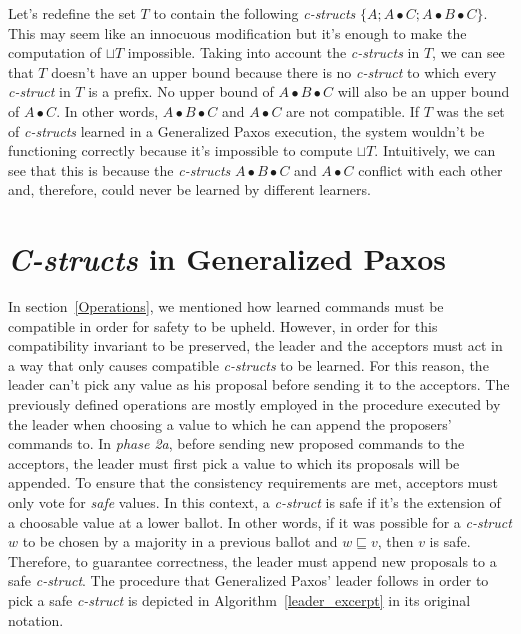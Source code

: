 Let's redefine the set $T$ to contain the following \textit{c-structs} $\{A ; A \bullet C ; A \bullet B \bullet C\}$. This may seem like an innocuous modification but it's enough to make the computation of $\sqcup T$ impossible. Taking into account the \textit{c-structs} in $T$, we can see that $T$ doesn't have an upper bound because there is no \textit{c-struct} to which every \textit{c-struct} in $T$ is a prefix. No upper bound of $A \bullet B \bullet C$ will also be an upper bound of $A \bullet C$. In other words, $A \bullet B \bullet C$ and $A \bullet C$ are not compatible. If $T$ was the set of \textit{c-structs} learned in a Generalized Paxos execution, the system wouldn't be functioning correctly because it's impossible to compute $\sqcup T$. Intuitively, we can see that this is because the \textit{c-structs} $A \bullet B \bullet C$ and $A \bullet C$ conflict with each other and, therefore, could never be learned by different learners. \par 


\section{\textit{C-structs} in Generalized Paxos}
In section~\ref{Operations}, we mentioned how learned commands must be compatible in order for safety to be upheld. However, in order for this compatibility invariant to be preserved, the leader and the acceptors must act in a way that only causes compatible \textit{c-structs} to be learned. For this reason, the leader can't pick any value as his proposal before sending it to the acceptors. The previously defined operations are mostly employed in the procedure executed by the leader when choosing a value to which he can append the proposers' commands to. In \textit{phase 2a}, before sending new proposed commands to the acceptors, the leader must first pick a value to which its proposals will be appended. To ensure that the consistency requirements are met, acceptors must only vote for \textit{safe} values. In this context, a \textit{c-struct} is safe if it's the extension of a choosable value at a lower ballot. In other words, if it was possible for a \textit{c-struct} $w$ to be chosen by a majority in a previous ballot and $w \sqsubseteq v$, then $v$ is safe. Therefore, to guarantee correctness, the leader must append new proposals to a safe \textit{c-struct}. The procedure that Generalized Paxos' leader follows in order to pick a safe \textit{c-struct} is depicted in Algorithm~\ref{leader_excerpt} in its original notation.\par

